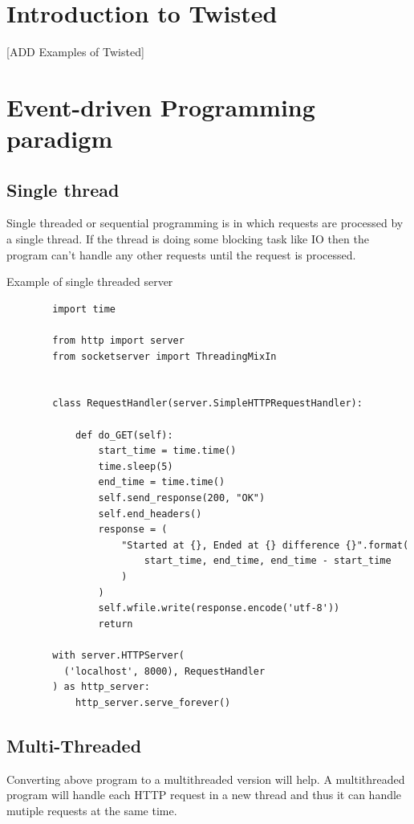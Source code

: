 \documentclass{article}
\begin{document}
  \section{Introduction to Twisted}
    [ADD Examples of Twisted]

  \section{Event-driven Programming paradigm}
    \subsection{Single thread}
      Single threaded or sequential programming is in which requests are
      processed by a single thread. If the thread is doing some blocking task
      like IO then the program can't handle any other requests until the
      request is processed.

      Example of single threaded server
      \begin{verbatim}
        import time

        from http import server
        from socketserver import ThreadingMixIn


        class RequestHandler(server.SimpleHTTPRequestHandler):

            def do_GET(self):
                start_time = time.time()
                time.sleep(5)
                end_time = time.time()
                self.send_response(200, "OK")
                self.end_headers()
                response = (
                    "Started at {}, Ended at {} difference {}".format(
                        start_time, end_time, end_time - start_time
                    )
                )
                self.wfile.write(response.encode('utf-8'))
                return

        with server.HTTPServer(
          ('localhost', 8000), RequestHandler
        ) as http_server:
            http_server.serve_forever()
      \end{verbatim}

    \subsection{Multi-Threaded}
      Converting above program to a multithreaded version will help. A
      multithreaded program will handle each HTTP request in a new thread and
      thus it can handle mutiple requests at the same time.
\end{document}
